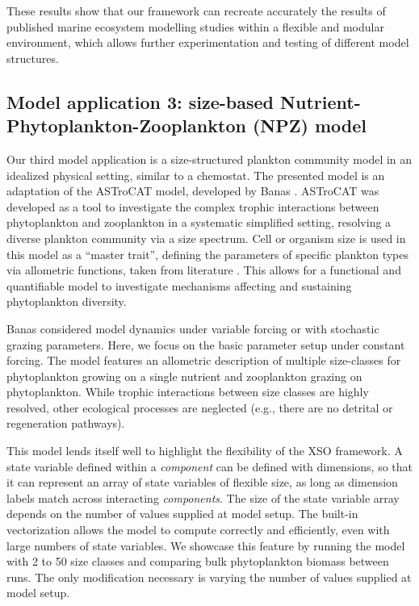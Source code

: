 \documentclass[journal abbreviation, manuscript]{copernicus}
\begin{document}
These results show that our framework can recreate accurately the results of published marine ecosystem modelling studies within a flexible and modular environment, which allows further experimentation and testing of different model structures.


\subsection{Model application 3: size-based Nutrient-Phytoplankton-Zooplankton (NPZ) model}

Our third model application is a size-structured plankton community model in an idealized physical setting, similar to a chemostat. The presented model is an adaptation of the ASTroCAT model, developed by Banas \citep{Banas2011b}. ASTroCAT was developed as a tool to investigate the complex trophic interactions between phytoplankton and zooplankton in a systematic simplified setting, resolving a diverse plankton community via a size spectrum. Cell or organism size is used in this model as a “master trait”, defining the parameters of specific plankton types via allometric functions, taken from literature \citep{Litchman2008}. This allows for a functional and quantifiable model to investigate mechanisms affecting and sustaining phytoplankton diversity.

Banas considered model dynamics under variable forcing or with stochastic grazing parameters. Here, we focus on the basic parameter setup under constant forcing. The model features an allometric description of multiple size-classes for phytoplankton growing on a single nutrient and zooplankton grazing on phytoplankton. While trophic interactions between size classes are highly resolved, other ecological processes are neglected (e.g., there are no detrital or regeneration pathways).  

This model lends itself well to highlight the flexibility of the XSO framework. A state variable defined within a \textit{component} can be defined with dimensions, so that it can represent an array of state variables of flexible size, as long as dimension labels match across interacting \textit{components}. The size of the state variable array depends on the number of values supplied at model setup. The built-in vectorization allows the model to compute correctly and efficiently, even with large numbers of state variables. We showcase this feature by running the model with 2 to 50 size classes and comparing bulk phytoplankton biomass between runs. The only modification necessary is varying the number of values supplied at model setup.
\end{document}
